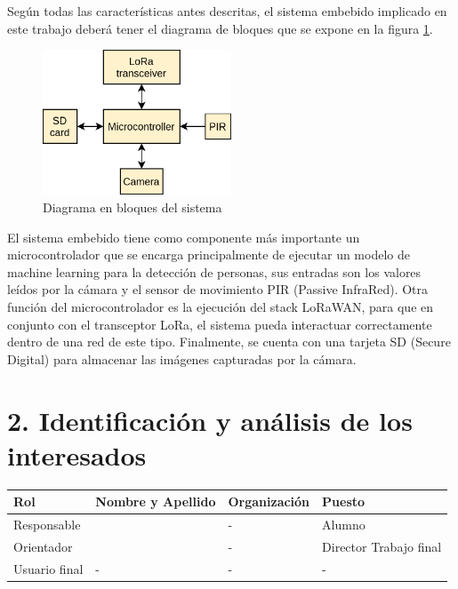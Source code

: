 \documentclass[
11pt, %
]{plan}
\begin{document}
\vspace{25px}

Según todas las características antes descritas, el sistema embebido implicado en este trabajo deberá tener el diagrama de bloques que se expone en la figura \ref{fig:blocks}.

\begin{figure}[htpb]
\centering
\includegraphics[width=0.5\textwidth]{./fig/blocks.png}
\caption{Diagrama en bloques del sistema}
\label{fig:blocks}
\end{figure}

\vspace{25px}

El sistema embebido tiene como componente más importante un microcontrolador que se encarga principalmente de ejecutar un modelo de machine learning para la detección de personas, sus entradas son los valores leídos por la cámara y el sensor de movimiento PIR (Passive InfraRed). Otra función del microcontrolador es la ejecución del stack LoRaWAN, para que en conjunto con el transceptor LoRa, el sistema pueda interactuar correctamente dentro de una red de este tipo. Finalmente, se cuenta con una tarjeta SD (Secure Digital) para almacenar las imágenes capturadas por la cámara.

\section{2. Identificación y análisis de los interesados}
\label{sec:interesados}

\begin{table}[ht]
\begin{tabularx}{\linewidth}{@{}|l|X|X|l|@{}}
\hline
\rowcolor[HTML]{C0C0C0}
Rol           & Nombre y Apellido & Organización 			& Puesto 	\\ \hline
Responsable   & \authorname		& -        				& Alumno 	\\ \hline
Orientador    & \supname			& - 						& Director Trabajo final \\ \hline
Usuario final & -                 & -             			& -       	\\ \hline
\end{tabularx}
\end{table}
\end{document}
